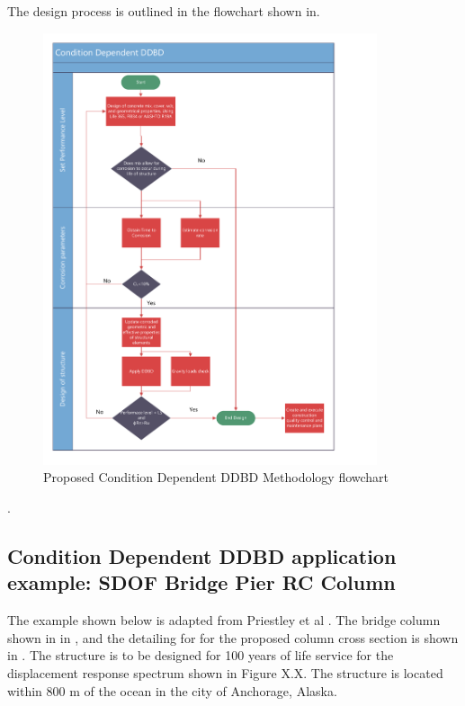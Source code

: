The design process is outlined in the flowchart shown in.

\begin{figure}[htbp]
	\centering
	\includegraphics[width=0.875\textwidth]{VAC Thesis 2.0/Chapter-6/figs/CD_DDBD_VictorCalderon.pdf}
	\caption{Proposed Condition Dependent DDBD Methodology flowchart}
	\label{fig:CD-DDBD_CH6}
\end{figure}. 

\subsection{Condition Dependent DDBD application example: SDOF Bridge Pier RC Column}

The example shown below is adapted from Priestley et al \cites{Priestley2007}. The bridge column shown in in , and the detailing for for the proposed column cross section is shown in . The structure is to be designed for 100 years of life service for the displacement response spectrum shown in Figure X.X. The structure is located within 800 m of the ocean in the city of Anchorage, Alaska.

